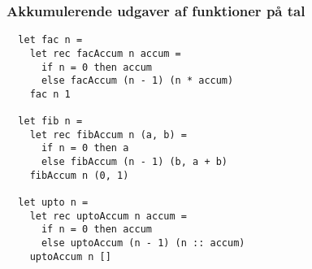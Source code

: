 \documentclass{beamer}
\begin{document}
\begin{frame}[fragile=singleslide]
\frametitle{Akkumulerende udgaver af funktioner på tal}


\begin{verbatim}
  let fac n =
    let rec facAccum n accum =
      if n = 0 then accum
      else facAccum (n - 1) (n * accum)
    fac n 1

  let fib n =
    let rec fibAccum n (a, b) =
      if n = 0 then a
      else fibAccum (n - 1) (b, a + b)
    fibAccum n (0, 1)

  let upto n =
    let rec uptoAccum n accum =
      if n = 0 then accum
      else uptoAccum (n - 1) (n :: accum)
    uptoAccum n []
\end{verbatim}


\end{frame}
\end{document}
